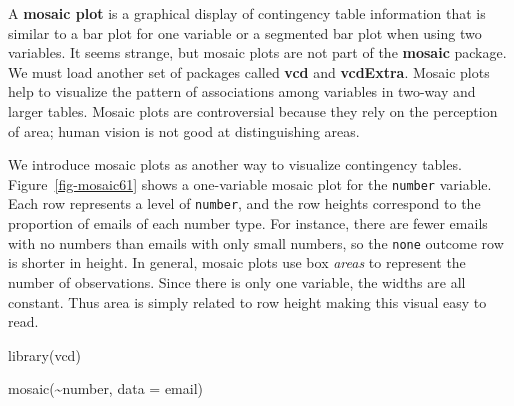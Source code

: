 \documentclass[
  letterpaper,
  DIV=11,
  numbers=noendperiod]{scrreprt}
\newenvironment{Shaded}{\begin{snugshade}}{\end{snugshade}}
\newcommand{\AttributeTok}[1]{\textcolor[rgb]{0.40,0.45,0.13}{#1}}
\newcommand{\FunctionTok}[1]{\textcolor[rgb]{0.28,0.35,0.67}{#1}}
\newcommand{\NormalTok}[1]{\textcolor[rgb]{0.00,0.23,0.31}{#1}}
\newcommand{\SpecialCharTok}[1]{\textcolor[rgb]{0.37,0.37,0.37}{#1}}
\begin{document}
A \textbf{mosaic plot} is a graphical display of contingency table
information that is similar to a bar plot for one variable or a
segmented bar plot when using two variables. It seems strange, but
mosaic plots are not part of the \textbf{mosaic} package. We must load
another set of packages called \textbf{vcd} and \textbf{vcdExtra}.
Mosaic plots help to visualize the pattern of associations among
variables in two-way and larger tables. Mosaic plots are controversial
because they rely on the perception of area; human vision is not good at
distinguishing areas.

We introduce mosaic plots as another way to visualize contingency
tables. Figure~\ref{fig-mosaic61} shows a one-variable mosaic plot for
the \texttt{number} variable. Each row represents a level of
\texttt{number}, and the row heights correspond to the proportion of
emails of each number type. For instance, there are fewer emails with no
numbers than emails with only small numbers, so the \texttt{none}
outcome row is shorter in height. In general, mosaic plots use box
\emph{areas} to represent the number of observations. Since there is
only one variable, the widths are all constant. Thus area is simply
related to row height making this visual easy to read.

\begin{Shaded}
\begin{Highlighting}[]
\FunctionTok{library}\NormalTok{(vcd)}
\end{Highlighting}
\end{Shaded}

\begin{Shaded}
\begin{Highlighting}[]
\FunctionTok{mosaic}\NormalTok{(}\SpecialCharTok{\textasciitilde{}}\NormalTok{number, }\AttributeTok{data =}\NormalTok{ email)}
\end{Highlighting}
\end{Shaded}
\end{document}
